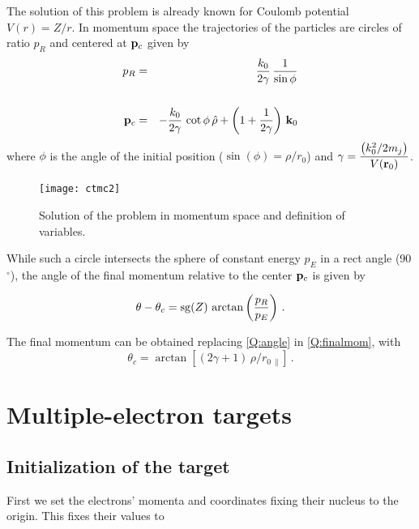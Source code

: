 The solution of this problem is already known for Coulomb potential
$V(r) = Z/r$. In momentum space the trajectories of the particles are
circles of ratio $p_{R}$ and centered at $\mathbf{p}_{c}$ given by
\begin{eqnarray}\label{Q:circle-mom}
p_{R} &=& \frac{k_{0}}{2 \gamma} \, \frac{1}{\sin{\phi}} \nonumber \\
\\
\mathbf{p}_{c} &=& - \frac{k_{0}}{2 \gamma } \, \cot{\phi}\, \hat{\rho} +
\left( 1 + \frac{1}{2 \gamma} \right) \, \mathbf{k}_{0} \nonumber
\end{eqnarray}
where $\phi$ is the angle of the initial position ($\sin(\phi) =
\rho/r_{0}$) and $\displaystyle{\gamma = \frac{\left( k_{0}^{2}/2 m_{j}
\right)}{V(\mathbf{r}_{0})}}$.

\begin{figure}%
  \centering
 \texttt{[image: ctmc2]}
  \caption{Solution of the problem in momentum space and definition of
  variables.
  \label{f:ctmc2}}
\end{figure}

While such a circle intersects the sphere of constant energy $p_{E}$ in
a rect angle (90$^{\circ}$), the angle of the final momentum relative to the
center $\mathbf{p}_{c}$ is given by

\begin{equation}\label{Q:angle}
\theta - \theta_{c} = {\rm sg}(Z) \, \arctan{\left( \frac{p_{R}}{p_{E}}
\right)} \ .
\end{equation}

The final momentum can be obtained replacing \ref{Q:angle} in
\ref{Q:finalmom}, with
\[
\theta_{c} = \arctan\left[(2 \gamma + 1) \, \rho / r_{0\, \|} \right]
\,.
\]

\section{Multiple-electron targets}

\subsection{Initialization of the target}
\label{S:Initi-targe}

First we set the electrons' momenta and coordinates fixing their
nucleus to the origin. This fixes their values to

